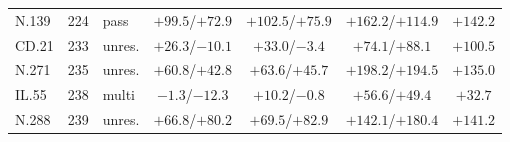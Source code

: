 \begin{tabular}{lrlcccc}
N.139 & 224 & pass & $+99.5$/$+72.9$ & $+102.5$/$+75.9$ & $+162.2$/$+114.9$ & $+142.2$ \\
CD.21 & 233 & unres. & $+26.3$/$-10.1$ & $+33.0$/$-3.4$ & $+74.1$/$+88.1$ & $+100.5$ \\
N.271 & 235 & unres. & $+60.8$/$+42.8$ & $+63.6$/$+45.7$ & $+198.2$/$+194.5$ & $+135.0$ \\
IL.55 & 238 & multi & $-1.3$/$-12.3$ & $+10.2$/$-0.8$ & $+56.6$/$+49.4$ & $+32.7$ \\
N.288 & 239 & unres. & $+66.8$/$+80.2$ & $+69.5$/$+82.9$ & $+142.1$/$+180.4$ & $+141.2$ \\
\bottomrule
\end{tabular}
